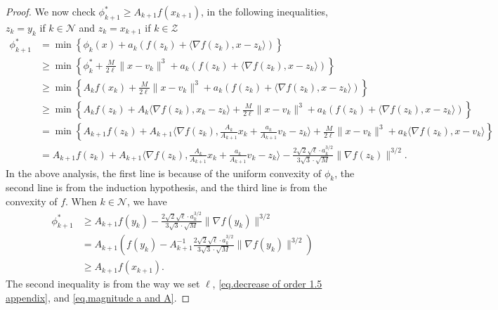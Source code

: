 \documentclass{article}
\theoremstyle{plain}
\theoremstyle{definition}
\theoremstyle{remark}
\begin{document}
\begin{proof}
    We now check $\phi_{k+1}^* \geq A_{k+1}f(x_{k+1})$, in the following inequalities, $z_k=y_k$ if $k\in\mathcal{N}$ and $z_k=x_{k+1}$ if $k\in\mathcal{Z}$
    \begin{equation*}
        \begin{aligned}
            \phi_{k+1}^* & = \min \left \{ \phi_k(x)+a_k \left (f(z_k)+\langle \nabla f(z_k),x-z_k\rangle \right)\right \}                                                                                                    \\
                         & \geq \min \left \{ \phi_k^* +\frac{M}{2\ell}\|x-v_k\|^3+a_k \left (f(z_k)+\langle \nabla f(z_k),x-z_k\rangle \right)\right \}                                                                      \\
                         & \geq \min \left \{ A_k f(x_k) +\frac{M}{2\ell}\|x-v_k\|^3+a_k \left (f(z_k)+\langle \nabla f(z_k),x-z_k\rangle \right)\right \}                                                                    \\
                         & \geq \min \left \{ A_k f(z_k) +A_k \langle \nabla f(z_k),x_k-z_k\rangle +\frac{M}{2\ell}\|x-v_k\|^3+a_k \left (f(z_k)+\langle \nabla f(z_k),x-z_k\rangle \right)\right \}                          \\
                         & = \min \left \{ A_{k+1} f(z_k)+A_{k+1} \langle \nabla f(z_k),\frac{A_k}{A_{k+1}}x_k+\frac{a_k}{A_{k+1}}v_k-z_k\rangle +\frac{M}{2\ell}\|x-v_k\|^3+a_k\langle \nabla f(z_k),x-v_k\rangle\right \}   \\
                         & = A_{k+1} f(z_k)+A_{k+1} \langle \nabla f(z_k),\frac{A_k}{A_{k+1}}x_k+\frac{a_k}{A_{k+1}}v_k-z_k\rangle-\frac{2\sqrt{2}\sqrt{\ell}\cdot a_k^{3/2}}{3\sqrt{3}\cdot\sqrt{M}}\|\nabla f(z_k)\|^{3/2}.
        \end{aligned}
    \end{equation*}
    In the above analysis, the first line is because of the uniform convexity of $\phi_k$, the second line is from the induction hypothesis, and the third line is from the convexity of $f$. When $k\in \mathcal{N}$, we have
    \begin{equation*}
        \begin{aligned}
            \phi_{k+1}^* & \geq A_{k+1}f(y_k)-\frac{2\sqrt{2}\sqrt{\ell}\cdot a_k^{3/2}}{3\sqrt{3}\cdot\sqrt{M}}\|\nabla f(y_k)\|^{3/2}                       \\
                         & = A_{k+1}\left(f(y_k)-A_{k+1}^{-1}\frac{2\sqrt{2}\sqrt{\ell}\cdot a_k^{3/2}}{3\sqrt{3}\cdot\sqrt{M}}\|\nabla f(y_k)\|^{3/2}\right) \\
                         & \geq A_{k+1}f(x_{k+1}).
        \end{aligned}
    \end{equation*}
    The second inequality is from the way we set $\ell$, \eqref{eq.decrease of order 1.5 appendix}, and \eqref{eq.magnitude a and A}.


\end{proof}
\end{document}
